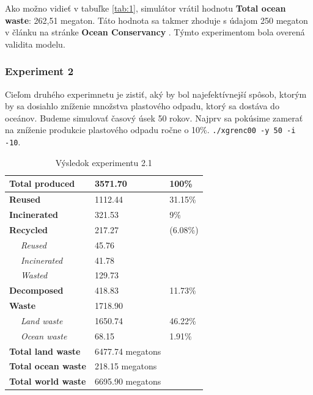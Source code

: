 \documentclass[a4paper, 11pt]{article}
\begin{document}
Ako možno vidieť v tabuľke \ref{tab:1}, simulátor vrátil hodnotu \textbf{Total ocean waste}: 262,51 megaton. Táto hodnota sa takmer zhoduje s údajom 250 megaton v článku na stránke \textbf{Ocean Conservancy} \cite{ocean_conservancy}. Týmto experimentom bola overená validita modelu.

\pagebreak
\subsubsection{Experiment 2}
\label{label:exp2}

Cieľom druhého experimnetu je zistiť, aký by bol najefektívnejší spôsob, ktorým by sa dosiahlo zníženie množstva plastového odpadu, ktorý sa dostáva do oceánov.
Budeme simulovať časový úsek 50 rokov. Najprv sa pokúsime zamerať na zníženie produkcie plastového odpadu ročne o 10\%.
\texttt{./xgrenc00 -y 50 -i -10}.

\begin{table}[ht]
	\centering
	\begin{tabular}{|l|l|l|l|}
		\hline
		\multicolumn{2}{|l|}{\textbf{Total produced}}    & 3571.70              & 100\%              \\ \hline
		\multicolumn{2}{|l|}{\textbf{Reused}}            & 1112.44              & 31.15\%            \\ \hline
		\multicolumn{2}{|l|}{\textbf{Incinerated}}       & 321.53               & 9\%                \\ \hline
		\multicolumn{2}{|l|}{\textbf{Recycled}}          & 217.27               & (6.08\%)           \\ \hline
		                                                 & \textit{Reused}      & 45.76    &         \\ \hline
		                                                 & \textit{Incinerated} & 41.78    &         \\ \hline
		                                                 & \textit{Wasted}      & 129.73   &         \\ \hline
		\multicolumn{2}{|l|}{\textbf{Decomposed}}        & 418.83               & 11.73\%            \\ \hline
		\multicolumn{2}{|l|}{\textbf{Waste}}             & 1718.90              &                    \\ \hline
		                                                 & \textit{Land waste}  & 1650.74  & 46.22\% \\ \hline
		                                                 & \textit{Ocean waste} & 68.15    & 1.91\%  \\ \hline
		\multicolumn{2}{|l|}{\textbf{Total land waste}}  & 6477.74 megatons     &                    \\ \hline
		\multicolumn{2}{|l|}{\textbf{Total ocean waste}} & 218.15 megatons      &                    \\ \hline
		\multicolumn{2}{|l|}{\textbf{Total world waste}} & 6695.90 megatons     &                    \\ \hline
	\end{tabular}
	\caption{Výsledok experimentu 2.1}
	\label{tab:2}
\end{table}
\end{document}
